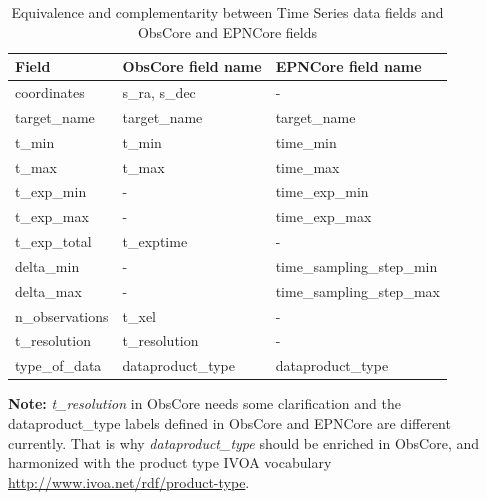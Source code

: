\documentclass[11pt,a4paper]{ivoa}
\begin{document}
\begin{table}[!htb]
  \begin{center}
  \begin{small}
  \caption{Equivalence and complementarity between Time Series data fields and ObsCore and EPNCore fields}
   \label{tab:obs_epn}
  \begin{tabular}{|l|l|l|}
\hline
    \textbf{Field}      & \textbf{ObsCore field name} & \textbf{EPNCore field name}  \\%
\hline
    coordinates     & s\_ra, s\_dec          & -                         \\
    \hline
    target\_name    & target\_name           & target\_name              \\
    \hline
    t\_min          & t\_min                 & time\_min                 \\
    \hline
    t\_max          & t\_max                 & time\_max                 \\
    \hline
    t\_exp\_min     &  -                     & time\_exp\_min            \\
    \hline
    t\_exp\_max     &  -                     & time\_exp\_max            \\
    \hline
    t\_exp\_total   &  t\_exptime              & -                         \\
    \hline
    delta\_min      &  -                     & time\_sampling\_step\_min \\
    \hline
    delta\_max      &  -                     & time\_sampling\_step\_max \\
    \hline
    n\_observations & t\_xel                 & -                         \\
    \hline
     t\_resolution   & t\_resolution      & -                         \\
    type\_of\_data  & dataproduct\_type & dataproduct\_type         \\
\hline
  \end{tabular}
  \end{small}

  \end{center}
 \end{table}

\textbf{ Note:}  \emph{t\_resolution} in ObsCore needs some clarification and the dataproduct\_type labels defined in ObsCore and EPNCore are different currently.
That is why \emph{dataproduct\_type} should be enriched in ObsCore, and harmonized with the product type IVOA vocabulary \url{http://www.ivoa.net/rdf/product-type}.
\end{document}
